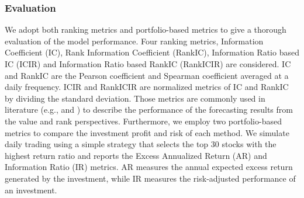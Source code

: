 \subsubsection{Evaluation}
We adopt both ranking metrics and portfolio-based metrics to give a thorough evaluation of the model performance. Four ranking metrics, Information Coefficient (IC), Rank Information Coefficient (RankIC), Information Ratio based IC (ICIR) and Information Ratio based RankIC (RankICIR) are considered. IC and RankIC are the Pearson coefficient and Spearman coefficient averaged at a daily frequency. ICIR and RankICIR are normalized metrics of IC and RankIC by dividing the standard deviation. Those metrics are commonly used in literature (e.g., \citealt{xu2021hist} and \citealt{yang2020qlib}) to describe the performance of the forecasting results from the value and rank perspectives.
Furthermore, we employ two portfolio-based metrics to compare the investment profit and risk of each method. 
We simulate daily trading using a simple strategy that selects the top 30 stocks with the highest return ratio and reports the Excess Annualized Return (AR) and Information Ratio (IR) metrics.
AR measures the annual expected excess return generated by the investment, while IR measures the risk-adjusted performance of an investment.

